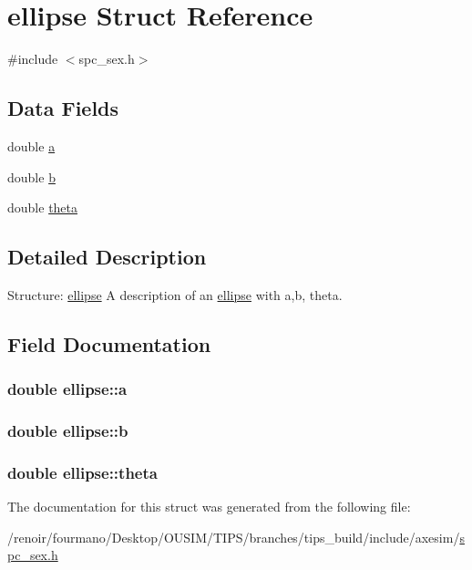 \hypertarget{structellipse}{
\section{ellipse Struct Reference}
\label{structellipse}
}


{\ttfamily \#include $<$spc\_\-sex.h$>$}\subsection*{Data Fields}
\begin{DoxyCompactItemize}
\item 
double \hyperlink{structellipse_a2fac14d548cade31112387455a842a69}{a}
\item 
double \hyperlink{structellipse_af6973a98639e96a46f99252a477a25fd}{b}
\item 
double \hyperlink{structellipse_ab6b6b276e1a61dd9fe682a57086e1ca6}{theta}
\end{DoxyCompactItemize}


\subsection{Detailed Description}
Structure: \hyperlink{structellipse}{ellipse} A description of an \hyperlink{structellipse}{ellipse} with a,b, theta. 

\subsection{Field Documentation}
\hypertarget{structellipse_a2fac14d548cade31112387455a842a69}{
\subsubsection[{a}]{\setlength{\rightskip}{0pt plus 5cm}double {\bf ellipse::a}}}
\label{structellipse_a2fac14d548cade31112387455a842a69}
\hypertarget{structellipse_af6973a98639e96a46f99252a477a25fd}{
\subsubsection[{b}]{\setlength{\rightskip}{0pt plus 5cm}double {\bf ellipse::b}}}
\label{structellipse_af6973a98639e96a46f99252a477a25fd}
\hypertarget{structellipse_ab6b6b276e1a61dd9fe682a57086e1ca6}{
\subsubsection[{theta}]{\setlength{\rightskip}{0pt plus 5cm}double {\bf ellipse::theta}}}
\label{structellipse_ab6b6b276e1a61dd9fe682a57086e1ca6}


The documentation for this struct was generated from the following file:\begin{DoxyCompactItemize}
\item 
/renoir/fourmano/Desktop/OUSIM/TIPS/branches/tips\_\-build/include/axesim/\hyperlink{spc__sex_8h}{spc\_\-sex.h}\end{DoxyCompactItemize}
